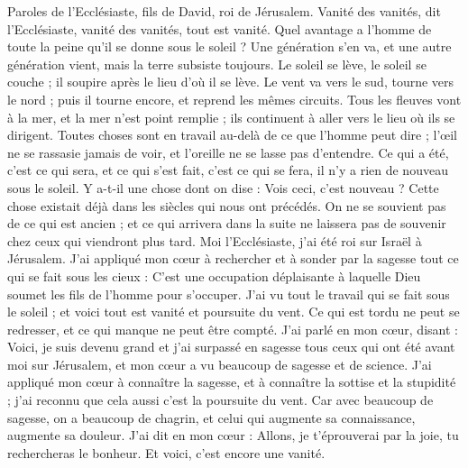 \begin{multicols}{2}
\VerseOne{}Paroles de l'Ecclésiaste, fils de David, roi de Jérusalem.
Vanité des vanités, dit l'Ecclésiaste, vanité des vanités, tout est vanité.
Quel avantage a l'homme de toute la peine qu’il se donne sous le soleil ?
Une génération s’en va, et une autre génération vient, mais la terre subsiste toujours.
Le soleil se lève, le soleil se couche ; il soupire après le lieu d'où il se lève.
Le vent va vers le sud, tourne vers le nord ; puis il tourne encore, et reprend les mêmes circuits.
Tous les fleuves vont à la mer, et la mer n’est point remplie ; ils continuent à aller vers le lieu où ils se dirigent.
Toutes choses sont en travail au-delà de ce que l'homme peut dire ; l'œil ne se rassasie jamais de voir, et l'oreille ne se lasse pas d'entendre.
Ce qui a été, c'est ce qui sera, et ce qui s’est fait, c’est ce qui se fera, il n'y a rien de nouveau sous le soleil.
Y a-t-il une chose dont on dise : Vois ceci, c’est nouveau ? Cette chose existait déjà dans les siècles qui nous ont précédés.
On ne se souvient pas de ce qui est ancien ; et ce qui arrivera dans la suite ne laissera pas de souvenir chez ceux qui viendront plus tard.
Moi l'Ecclésiaste, j'ai été roi sur Israël à Jérusalem.
J'ai appliqué mon cœur à rechercher et à sonder par la sagesse tout ce qui se fait sous les cieux : C’est une occupation déplaisante à laquelle Dieu soumet les fils de l’homme pour s’occuper.
J'ai vu tout le travail qui se fait sous le soleil ; et voici tout est vanité et poursuite du vent.
Ce qui est tordu ne peut se redresser, et ce qui manque ne peut être compté.
J'ai parlé en mon cœur, disant : Voici, je suis devenu grand et j’ai surpassé en sagesse tous ceux qui ont été avant moi sur Jérusalem, et mon cœur a vu beaucoup de sagesse et de science.
J'ai appliqué mon cœur à connaître la sagesse, et à connaître la sottise et la stupidité ; j'ai reconnu que cela aussi c’est la poursuite du vent.
Car avec beaucoup de sagesse, on a beaucoup de chagrin, et celui qui augmente sa connaissance, augmente sa douleur.
\VerseOne{}J'ai dit en mon cœur : Allons, je t'éprouverai par la joie, tu rechercheras le bonheur. Et voici, c’est encore une vanité.

\end{multicols}
